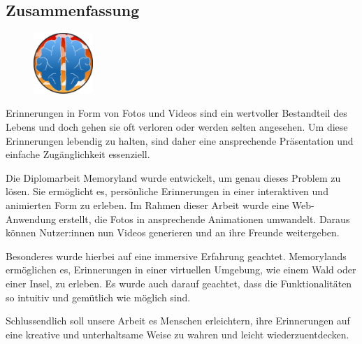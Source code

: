 \newpage
\begin{spacing}{1}
    \chapter*{Zusammenfassung}
\end{spacing}
\begin{figure}
    \begin{center}
      \includegraphics[width=0.2\textwidth]{pics/memoryland-logo.png}
    \end{center}
\end{figure}
Erinnerungen in Form von Fotos und Videos sind ein wertvoller Bestandteil des Lebens und doch
gehen sie oft verloren oder werden selten angesehen. Um diese Erinnerungen lebendig zu halten,
sind daher eine ansprechende Präsentation und einfache Zugänglichkeit essenziell.

Die Diplomarbeit Memoryland wurde entwickelt, um genau dieses Problem zu lösen. Sie ermöglicht es, 
persönliche Erinnerungen in einer interaktiven und animierten Form zu erleben. Im Rahmen dieser 
Arbeit wurde eine Web-Anwendung erstellt, die Fotos in ansprechende Animationen umwandelt. 
Daraus können Nutzer:innen nun Videos generieren und an ihre Freunde weitergeben.

Besonderes wurde hierbei auf eine immersive Erfahrung geachtet. Memorylands ermöglichen es, 
Erinnerungen in einer virtuellen Umgebung, wie einem Wald oder einer Insel, zu erleben. Es
wurde auch darauf geachtet, dass die Funktionalitäten so intuitiv und gemütlich wie möglich
sind.

Schlussendlich soll unsere Arbeit es Menschen erleichtern, ihre Erinnerungen auf eine 
kreative und unterhaltsame Weise zu wahren und leicht wiederzuentdecken.

